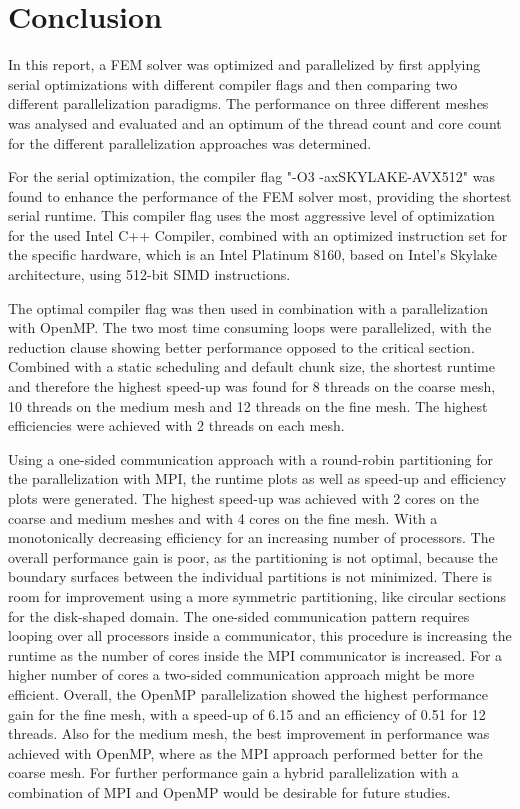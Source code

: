 \section{Conclusion}

In this report, a FEM solver was optimized and parallelized by first applying serial optimizations with different compiler flags and then comparing two different parallelization paradigms. The performance on three different meshes was analysed and evaluated and an optimum of the thread count and core count for the different parallelization approaches was determined.

For the serial optimization, the compiler flag "-O3 -axSKYLAKE-AVX512" was found to enhance the performance of the FEM solver most, providing the shortest serial runtime. This compiler flag uses the most aggressive level of optimization for the used Intel C++ Compiler, combined with an optimized instruction set for the specific hardware, which is an Intel Platinum 8160, based on Intel's Skylake architecture, using 512-bit SIMD instructions. 

The optimal compiler flag was then used in combination with a parallelization with OpenMP. The two most time consuming loops were parallelized, with the reduction clause showing better performance opposed to the critical section. Combined with a static scheduling and default chunk size, the shortest runtime and therefore the highest speed-up was found for 8 threads on the coarse mesh, 10 threads on the medium mesh and 12 threads on the fine mesh. The highest efficiencies were achieved with 2 threads on each mesh. 

Using a one-sided communication approach with a round-robin partitioning for the parallelization with MPI, the runtime plots as well as speed-up and efficiency plots were generated. The highest speed-up was achieved with 2 cores on the coarse and medium meshes and with 4 cores on the fine mesh. With a monotonically decreasing efficiency for an increasing number of processors. The overall performance gain is poor, as the partitioning is not optimal, because the boundary surfaces between the individual partitions is not minimized. There is room for improvement using a more symmetric partitioning, like circular sections for the disk-shaped domain. The one-sided communication pattern requires looping over all processors inside a communicator, this procedure is increasing the runtime as the number of cores inside the MPI communicator is increased. For a higher number of cores a two-sided communication approach might be more efficient. Overall, the OpenMP parallelization showed the highest performance gain for the fine mesh, with a speed-up of 6.15 and an efficiency of 0.51 for 12 threads. Also for the medium mesh, the best improvement in performance was achieved with OpenMP, where as the MPI approach performed better for the coarse mesh. For further performance gain a hybrid parallelization with a combination of MPI and OpenMP would be desirable for future studies.